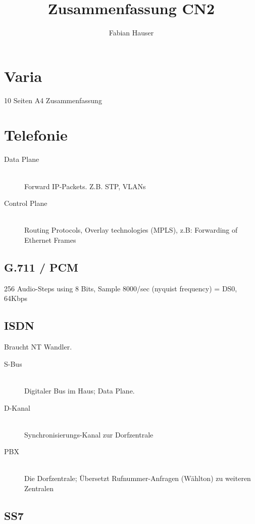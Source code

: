 

\title{Zusammenfassung CN2}
\author{Fabian Hauser}
 

\maketitle

\section{Varia}
10 Seiten A4 Zusammenfassung

\section{Telefonie}

\begin{description}
\item[Data Plane] \hfill \\
	Forward IP-Packets. Z.B. STP, VLANs
\item[Control Plane] \hfill \\
	Routing Protocols, Overlay technologies (MPLS), z.B: Forwarding of Ethernet Frames
\end{description}


\subsection{G.711 / PCM}
 256 Audio-Steps using 8 Bits, Sample 8000/sec (nyquist frequency) = DS0, 64Kbps


\subsection{ISDN}
Braucht NT Wandler.

\begin{description}
\item[S-Bus] \hfill \\
	 Digitaler Bus im Haus; Data Plane.
\item[D-Kanal] \hfill \\
	Synchronisierungs-Kanal zur Dorfzentrale
\item[PBX] \hfill \\
	Die Dorfzentrale; Übersetzt Rufnummer-Anfragen (Wählton) zu weiteren Zentralen

\end{description}

\subsection{SS7}

